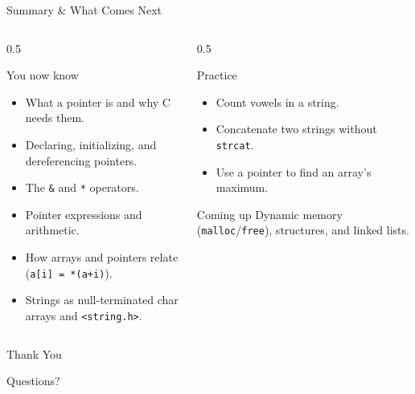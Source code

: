 \documentclass[aspectratio=169]{beamer}
\begin{document}
	\begin{frame}{Summary \& What Comes Next}
		\begin{columns}[T]
			\begin{column}{0.5\textwidth}
				\begin{block}{You now know}
					\begin{itemize}\small
						\item What a pointer is and why C needs them.
						\item Declaring, initializing, and dereferencing pointers.
						\item The \texttt{\&} and \texttt{*} operators.
						\item Pointer expressions and arithmetic.
						\item How arrays and pointers relate (\texttt{a[i] = *(a+i)}).
						\item Strings as null-terminated char arrays and \texttt{<string.h>}.
					\end{itemize}
				\end{block}
			\end{column}
			\begin{column}{0.5\textwidth}
				\begin{block}{Practice}
					\begin{itemize}\small
						\item Count vowels in a string.
						\item Concatenate two strings without \texttt{strcat}.
						\item Use a pointer to find an array's maximum.
					\end{itemize}
				\end{block}
				\begin{block}{Coming up}
					\small Dynamic memory (\texttt{malloc}/\texttt{free}), structures, and linked lists.
				\end{block}
			\end{column}
		\end{columns}
	\end{frame}

	\begin{frame}
		\centering
		\Huge Thank You
		\vspace{0.5cm}

		\normalsize Questions?
	\end{frame}

\end{document}
